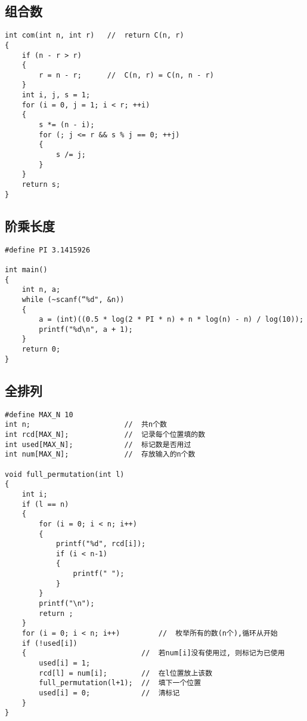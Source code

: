 \subsection{组合数}
\begin{lstlisting}
int com(int n, int r)   //  return C(n, r)
{
	if (n - r > r)
	{
		r = n - r;      //  C(n, r) = C(n, n - r)
	}
	int i, j, s = 1;
	for (i = 0, j = 1; i < r; ++i)
	{
		s *= (n - i);
		for (; j <= r && s % j == 0; ++j)
		{
			s /= j;
		}
	}
	return s;
}
\end{lstlisting}

\subsection{阶乘长度}
\begin{lstlisting}
#define PI 3.1415926

int main()
{
	int n, a;
	while (~scanf(“%d", &n))
	{
		a = (int)((0.5 * log(2 * PI * n) + n * log(n) - n) / log(10));
		printf("%d\n", a + 1);
	}
	return 0;
}
\end{lstlisting}

\subsection{全排列}
\begin{lstlisting}
#define MAX_N 10
int n;                      //  共n个数
int rcd[MAX_N];             //  记录每个位置填的数
int used[MAX_N];            //  标记数是否用过
int num[MAX_N];             //  存放输入的n个数

void full_permutation(int l)
{
	int i;
	if (l == n)
	{
		for (i = 0; i < n; i++)
		{
			printf("%d", rcd[i]);
			if (i < n-1)
			{
				printf(" ");
			}
		}
		printf("\n");
		return ;
	}
	for (i = 0; i < n; i++)         //  枚举所有的数(n个),循环从开始
	if (!used[i])
	{                           //  若num[i]没有使用过, 则标记为已使用
		used[i] = 1;
		rcd[l] = num[i];        //  在l位置放上该数
		full_permutation(l+1);  //  填下一个位置
		used[i] = 0;            //  清标记
	}
}
\end{lstlisting}

